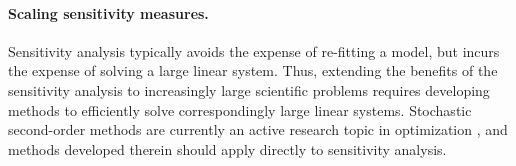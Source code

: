 %


\paragraph{Scaling sensitivity measures.}

Sensitivity analysis typically avoids the expense of re-fitting a model, but
incurs the expense of solving a large linear system.  Thus, extending
the benefits of the sensitivity analysis to increasingly large scientific
problems requires developing methods to efficiently solve correspondingly large
linear systems.  Stochastic second-order methods are currently an active
research topic in optimization \citep{agarwal:2017:secondorder,
berahas:2020:newtonsketch}, and methods developed therein should apply
directly to sensitivity analysis.

